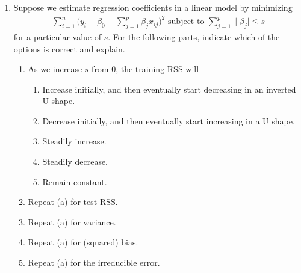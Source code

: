 \documentclass[../statistical_learning_notes.tex]{subfiles}
\begin{document}
\begin{enumerate}
        \item Suppose we estimate regression coefficients in a linear model by minimizing
        \begin{gather*}
            \sum_{i=1}^{n}\bigg( y_{i} - \beta_{0} - \sum_{j=1}^{p}\beta_{j}x_{ij} \bigg)^{2} \text{ subject to } \sum_{j=1}^{p}\mid \beta_{j} \mid \leq s
        \end{gather*}
        for a particular value of $s$. For the following parts, indicate which of the options is correct and explain.
        \begin{enumerate}
            \item As we increase $s$ from 0, the training RSS will
            \begin{enumerate}
                \item Increase initially, and then eventually start decreasing in an inverted U shape.
                \item Decrease initially, and then eventually start increasing in a U shape.
                \item Steadily increase.
                \item Steadily decrease.
                \item Remain constant.
            \end{enumerate}
            \item Repeat (a) for test RSS.
            \item Repeat (a) for variance.
            \item Repeat (a) for (squared) bias.
            \item Repeat (a) for the irreducible error.
        \end{enumerate}
        

\end{enumerate}
\end{document}
